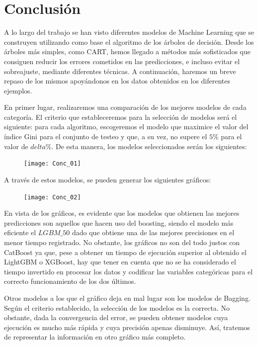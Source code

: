 \documentclass[12pt,twoside]{article}
\begin{document}
\newpage
\section{Conclusión}
A lo largo del trabajo se han visto diferentes modelos de Machine Learning que se construyen utilizando como base el algoritmo de los árboles de decisión. Desde los árboles más simples, como CART, hemos llegado a métodos más sofisticados que consiguen reducir los errores cometidos en las predicciones, e incluso evitar el sobreajuste, mediante diferentes técnicas. A continuación, haremos un breve repaso de los mismos apoyándonos en los datos obtenidos en los diferentes ejemplos.

En primer lugar, realizaremos una comparación de los mejores modelos de cada categoría. El criterio que estableceremos para la selección de modelos será el siguiente: para cada algoritmo, escogeremos el modelo que maximice el valor del índice Gini para el conjunto de testeo y que, a su vez, no supere el $5\%$ para el valor de $delta\%$. De esta manera, los modelos seleccionados serán los siguientes:
\begin{figure}[h]
\centering
\texttt{[image: Conc\_01]}
\end{figure}

A través de estos modelos, se pueden generar los siguientes gráficos:
\begin{figure}[h]
\centering
\texttt{[image: Conc\_02]}
\end{figure}

En vista de los gráficos, es evidente que los modelos que obtienen las mejores predicciones son aquellos que hacen uso del boosting, siendo el modelo más eficiente el $LGBM\_50$ dado que obtiene una de las mejores precisiones en el menor tiempo registrado. No obstante, los gráficos no son del todo justos con CatBoost ya que, pese a obtener un tiempo de ejecución superior al obtenido el LightGBM o XGBoost, hay que tener en cuenta que no se ha considerado el tiempo invertido en procesar los datos y codificar las variables categóricas para el correcto funcionamiento de los dos últimos.

Otros modelos a los que el gráfico deja en mal lugar son los modelos de Bagging. Según el criterio establecido, la selección de los modelos es la correcta. No obstante, dada la convergencia del error, se pueden obtener modelos cuya ejecución es mucho más rápida y cuya precisión apenas disminuye. Así, tratemos de representar la información en otro gráfico más completo.
\end{document}
